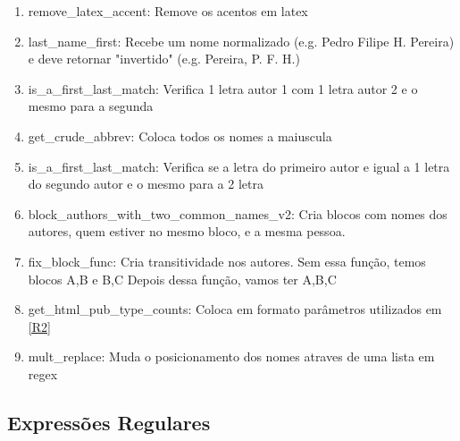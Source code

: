 \documentclass[11pt,a4paper]{report}
\begin{document}
\begin{enumerate}[label=\textbf{L\arabic*}]
    \item \label{L21}remove\_latex\_accent: Remove os acentos em latex 
    \item \label{L22}last\_name\_first: Recebe um nome normalizado (e.g. Pedro Filipe H. Pereira) e deve retornar "invertido" (e.g. Pereira, P. F. H.)
    \item \label{L23}is\_a\_first\_last\_match: Verifica 1 letra autor 1 com 1 letra autor 2 e o mesmo para a segunda
    \item \label{L24}get\_crude\_abbrev: Coloca todos os nomes a maiuscula
    \item \label{L25}is\_a\_first\_last\_match: Verifica se a letra do primeiro autor e igual a 1 letra do segundo autor e o mesmo para a 2 letra  
    \item \label{L26}block\_authors\_with\_two\_common\_names\_v2: Cria blocos com nomes dos autores, quem estiver no mesmo bloco, e a mesma pessoa.
    \item \label{L27}fix\_block\_func: Cria transitividade nos autores.  Sem essa função, temos blocos {A,B} e {B,C} Depois dessa função, vamos ter {A,B,C}
    \item \label{L28}get\_html\_pub\_type\_counts: Coloca  em formato \htlm parâmetros utilizados em \ref{R2}
    \item \label{L29}mult\_replace: Muda o posicionamento dos nomes atraves de uma lista em regex
\end{enumerate}

\newpage
\subsection{Expressões Regulares}
\end{document}
